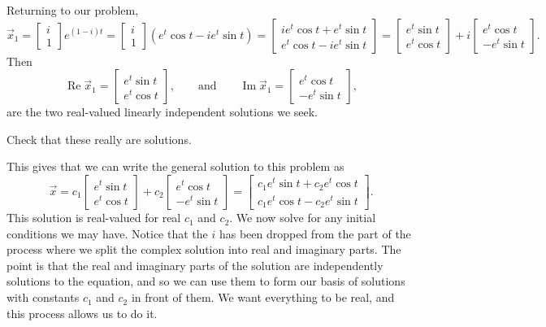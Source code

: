 Returning to our problem,
\begin{equation*}
\vec{x}_1 =
\begin{bmatrix} i \\ 1 \end{bmatrix} e^{(1-i)t}
=
\begin{bmatrix} i \\ 1 \end{bmatrix} \left( e^t \cos t - i e^t \sin t \right)
=
\begin{bmatrix}
i e^t \cos t + e^t \sin t  \\
e^t \cos t - i e^t \sin t
\end{bmatrix}
=
\begin{bmatrix}
e^t \sin t  \\
e^t \cos t
\end{bmatrix}
+ i
\begin{bmatrix}
e^t \cos t  \\
- e^t \sin t
\end{bmatrix}
.
\end{equation*}
Then
\begin{equation*}
\operatorname{Re} \vec{x}_1 = 
\begin{bmatrix}
e^t \sin t  \\
e^t \cos t
\end{bmatrix} ,
\qquad \text{and} \qquad
\operatorname{Im} \vec{x}_1 = 
\begin{bmatrix}
e^t \cos t \\
- e^t \sin t
\end{bmatrix} ,
\end{equation*}
are the two real-valued linearly independent solutions we seek.

\begin{exercise}
Check that these really are solutions.
\end{exercise}

This gives that we can write the general solution to this problem as
\begin{equation*}
\vec{x}
=
c_1
\begin{bmatrix}
e^t \sin t  \\
e^t \cos t
\end{bmatrix} 
+ c_2
\begin{bmatrix}
e^t \cos t \\
-e^t \sin t
\end{bmatrix} 
=
\begin{bmatrix}
c_1 e^t \sin t + c_2 e^t \cos t \\
c_1 e^t \cos t - c_2 e^t \sin t
\end{bmatrix} .
\end{equation*}
This solution is real-valued for real $c_1$ and $c_2$.  We now solve
for any initial conditions we may have. Notice that the $i$ has been dropped from the part of the process where we split the complex solution into real and imaginary parts. The point is that the real and imaginary parts of the solution are independently solutions to the equation, and so we can use them to form our basis of solutions with constants $c_1$ and $c_2$ in front of them. We want everything to be real, and this process allows us to do it.

